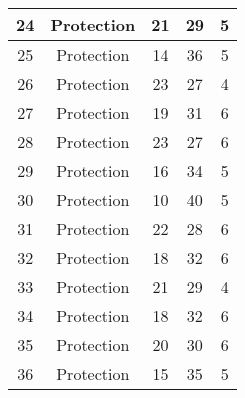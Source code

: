 \documentclass[results.tex]{subfiles}
\begin{document}
\begin{center}
\begin{tabular}{| c || c | c | c | c |}
            \hline
            24                      & Protection                   & 21                     & 29                      & 5                    \\
            \hline
            25                      & Protection                   & 14                     & 36                      & 5                    \\
            \hline
            26                      & Protection                   & 23                     & 27                      & 4                    \\
            \hline
            27                      & Protection                   & 19                     & 31                      & 6                    \\
            \hline
            28                      & Protection                   & 23                     & 27                      & 6                    \\
            \hline
            29                      & Protection                   & 16                     & 34                      & 5                    \\
            \hline
            30                      & Protection                   & 10                     & 40                      & 5                    \\
            \hline
            31                      & Protection                   & 22                     & 28                      & 6                    \\
            \hline
            32                      & Protection                   & 18                     & 32                      & 6                    \\
            \hline
            33                      & Protection                   & 21                     & 29                      & 4                    \\
            \hline
            34                      & Protection                   & 18                     & 32                      & 6                    \\
            \hline
            35                      & Protection                   & 20                     & 30                      & 6                    \\
            \hline
            36                      & Protection                   & 15                     & 35                      & 5                    \\

\end{tabular}
\end{center}
\end{document}
